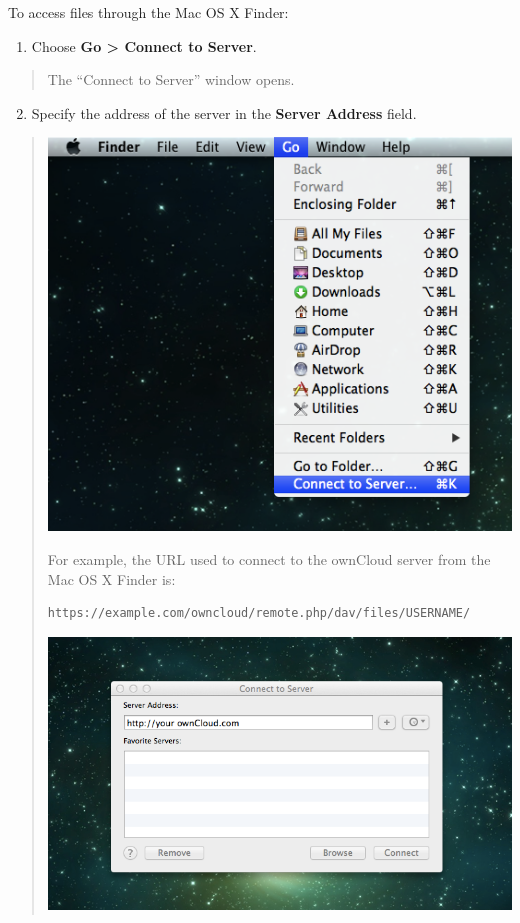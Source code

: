 \documentclass[letterpaper,10pt,english]{sphinxmanual}
\begin{document}
To access files through the Mac OS X Finder:
\begin{enumerate}
\item {} 
Choose \textbf{Go \textgreater{} Connect to Server}.

\end{enumerate}
\begin{quote}

The ``Connect to Server'' window opens.
\end{quote}
\begin{enumerate}
\setcounter{enumi}{1}
\item {} 
Specify the address of the server in the \textbf{Server Address} field.

\end{enumerate}
\begin{quote}

\includegraphics{osx_webdav1.png}

For example, the URL used to connect to the ownCloud server
from the Mac OS X Finder is:

\begin{Verbatim}[commandchars=\\\{\}]
https://example.com/owncloud/remote.php/dav/files/USERNAME/
\end{Verbatim}

\includegraphics{osx_webdav2.png}
\end{quote}
\end{document}
